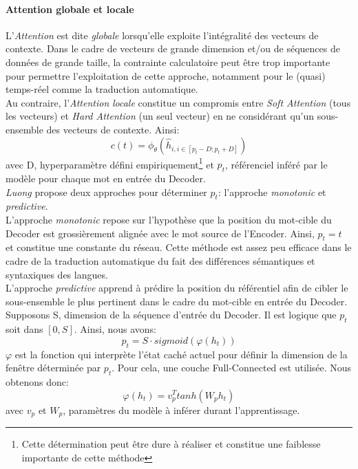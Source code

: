 \paragraph{Attention globale et locale}
L'\textit{Attention} est dite \textit{globale} lorsqu'elle exploite l'intégralité des vecteurs de contexte. Dans le cadre de vecteurs de grande dimension et/ou de séquences de données de grande taille, la contrainte calculatoire peut être trop importante pour permettre l'exploitation de cette approche, notamment pour le (quasi) temps-réel comme la traduction automatique.\\

\noindent Au contraire, l'\textit{Attention} \textit{locale} constitue un compromis entre \textit{Soft Attention} (tous les vecteurs) et \textit{Hard Attention} (un seul vecteur) en ne considérant qu'un sous-ensemble des vecteurs de contexte. Ainsi:
$$c(t)=\phi_\theta(\hat{h}_{i,i \in [p_t-D;p_t+D]})$$ avec D, hyperparamètre défini empiriquement\footnote{Cette détermination peut être dure à réaliser et constitue une faiblesse importante de cette méthode} et $p_t$, référenciel inféré par le modèle pour chaque mot en entrée du Decoder.\\

\noindent \textit{Luong} propose deux approches pour déterminer $p_t$: l'approche \textit{monotonic} et \textit{predictive}.\\

\noindent L'approche \textit{monotonic} repose sur l'hypothèse que la position du mot-cible du Decoder est grossièrement alignée avec le mot source de l'Encoder. Ainsi, $p_t=t$ et constitue une constante du réseau. Cette méthode est assez peu efficace dans le cadre de la traduction automatique du fait des différences sémantiques et syntaxiques des langues.\\

\noindent L'approche \textit{predictive} apprend à prédire la position du référentiel afin de cibler le sous-ensemble le plus pertinent dans le cadre du mot-cible en entrée du Decoder. Supposons S, dimension de la séquence d'entrée du Decoder. Il est logique que $p_t$ soit dans $[0,S]$. Ainsi, nous avons:
$$p_t=S \cdot sigmoid(\varphi(h_t))$$
\noindent $\varphi$ est la fonction qui interprète l'état caché actuel pour définir la dimension de la fenêtre déterminée par $p_t$. Pour cela, une couche Full-Connected est utilisée. Nous obtenons donc:
$$\varphi(h_t)=v_p^Ttanh(W_ph_t)$$ avec $v_p$ et $W_p$, paramètres du modèle à inférer durant l'apprentissage.\\

